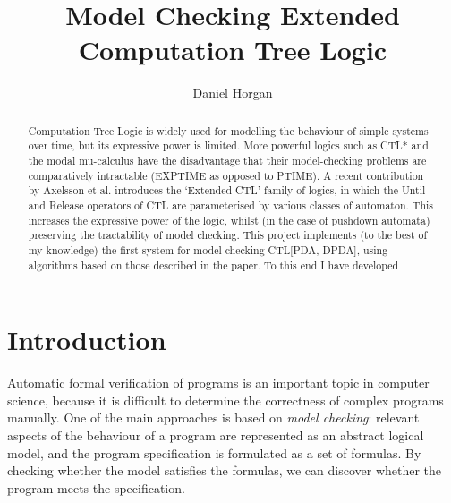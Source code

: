 \documentclass[11pt]{article}
\theoremstyle{definition}
\begin{document}
\title{Model Checking Extended Computation Tree Logic}
\author{Daniel Horgan}
\maketitle

\begin{comment}
[scratch]
Blablabla said Nobody ~\cite{Nobody06}.
\end{comment}

\begin{abstract}

Computation Tree Logic is widely used for modelling the behaviour of
simple systems over time, but its expressive power is limited.
More powerful logics such as CTL* and the modal mu-calculus have
the disadvantage that their model-checking problems are comparatively intractable
(EXPTIME as opposed to PTIME). A recent contribution by Axelsson et al.
introduces the `Extended CTL' family of logics, in which the Until and Release
operators of CTL are parameterised by various classes of automaton. This
increases the expressive power of the logic, whilst (in the case of pushdown
automata) preserving the tractability of model checking. 
This project implements (to the best of my knowledge) the first system for
model checking CTL[PDA, DPDA], using algorithms based on those described in the
paper. 
To this end I have developed %



\end{abstract}

\newpage

\tableofcontents
\setcounter{tocdepth}{3}

\newpage

\section{Introduction}

Automatic formal verification of programs is an important topic in computer
science, because it is difficult to determine the correctness of complex
programs manually. One of the main approaches is based on \textit{model
checking}: relevant aspects of the behaviour of a program are represented as an
abstract logical model, and the program specification is formulated as a set of
formulas. By checking whether the model satisfies the formulas, we can discover
whether the program meets the specification.
\end{document}
